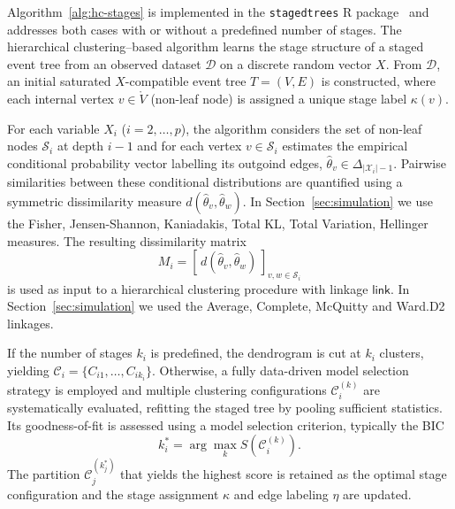\documentclass[preprint,12pt]{elsarticle}
\begin{document}
Algorithm~\ref{alg:hc-stages}
is implemented in the \texttt{stagedtrees}  R package~\cite{JSSv102i06} %
and addresses both cases
with or without a predefined number of stages.
The hierarchical clustering--based algorithm learns the stage structure of a staged event tree from an observed dataset 
$\mathcal{D}$ on a discrete random vector $X$. 
From $\mathcal{D}$, an initial saturated $X$-compatible event tree $T = (V, E)$ is constructed, where each internal vertex 
$v \in \mathring{V}$ (non-leaf node) %
is assigned a unique stage label $\kappa(v)$.

For each variable $X_i$ ($i = 2, \dots, p$), the algorithm considers the set of non-leaf nodes 
$\mathcal{S}_i$ at depth $i-1$ and  for each vertex $v \in \mathcal{S}_i$ estimates
the empirical conditional probability vector labelling its outgoind edges, 
$\hat{\theta}_v \in \Delta_{|\mathcal{X}_i|-1}$.
Pairwise similarities between these conditional distributions are quantified using a symmetric dissimilarity 
measure $d(\hat{\theta}_v, \hat{\theta}_w)$. In Section~\ref{sec:simulation} we use the Fisher, Jensen-Shannon, Kaniadakis, Total KL, Total Variation, Hellinger  measures. 
The resulting dissimilarity matrix
\[
M_i = [\, d(\hat{\theta}_v, \hat{\theta}_w) \,]_{v,w \in \mathcal{S}_i}
\]
is used as input to a hierarchical clustering procedure with linkage $\mathsf{link}$. In Section~\ref{sec:simulation} we used the Average, Complete, McQuitty and Ward.D2 linkages. 


If the number of stages $k_i$ is predefined, the dendrogram is cut at $k_i$ clusters, 
yielding $\mathcal{C}_i = \{C_{i1}, \dots, C_{ik_i}\}$. 
Otherwise, a fully data-driven model selection strategy is employed and multiple clustering configurations $\mathcal{C}_i^{(k)}$ are systematically evaluated, refitting the staged tree by pooling sufficient statistics. Its goodness-of-fit is assessed using a model selection criterion, typically the BIC
\[
k_i^* = \arg\max_k S(\mathcal{C}_i^{(k)}).
\]
The partition $\mathcal{C}_j^{(k_j^*)}$ that yields the highest  score is retained as the optimal stage configuration and the stage assignment $\kappa$ 
and edge labeling $\eta$ are updated. 
\end{document}
